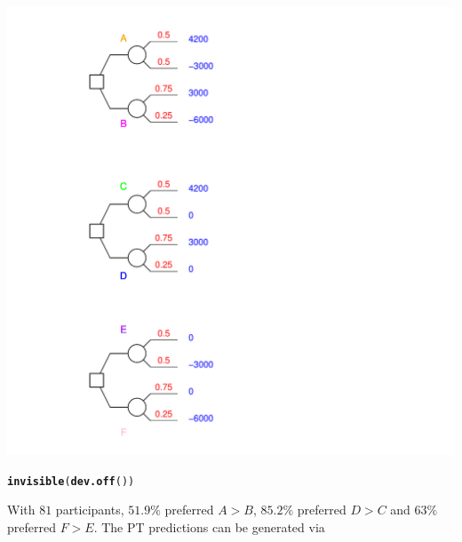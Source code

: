 \documentclass{article}\usepackage[]{graphicx}\usepackage[]{color}
\makeatletter
\newcommand{\hlstd}[1]{\textcolor[rgb]{0.345,0.345,0.345}{#1}}%
\newcommand{\hlkwd}[1]{\textcolor[rgb]{0.737,0.353,0.396}{\textbf{#1}}}%
\newenvironment{kframe}{%
 \def\at@end@of@kframe{}%
 \ifinner\ifhmode%
  \def\at@end@of@kframe{\end{minipage}}%
  \begin{minipage}{\columnwidth}%
 \fi\fi%
 \def\FrameCommand##1{\hskip\@totalleftmargin \hskip-\fboxsep
 \colorbox{shadecolor}{##1}\hskip-\fboxsep
     \hskip-\linewidth \hskip-\@totalleftmargin \hskip\columnwidth}%
 \MakeFramed {\advance\hsize-\width
   \@totalleftmargin\z@ \linewidth\hsize
   \@setminipage}}%
 {\par\unskip\endMakeFramed%
 \at@end@of@kframe}
\newenvironment{knitrout}{}{} %
\makeatother
\begin{document}
\begin{knitrout}
{\centering \includegraphics[width=0.8\linewidth]{figure/unnamed-chunk-40} 

}


\begin{kframe}\begin{alltt}
\hlkwd{invisible}\hlstd{(}\hlkwd{dev.off}\hlstd{())}
\end{alltt}
\end{kframe}
\end{knitrout}


With $81$ participants, $51.9\%$ preferred $A > B$, $85.2\%$ preferred $D > C$ and $63\%$ preferred $F > E$. The PT predictions can be generated via
\end{document}
